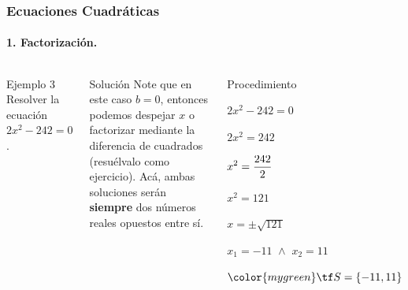 \documentclass[mathserif]{beamer}
\begin{document}
\begin{frame}
\frametitle{\bf Ecuaciones Cuadráticas} 
\framesubtitle{1. Factorización.}

    \begin{columns}
        \begin{exampleblock}{Ejemplo 3}
        \bc
        Resolver la ecuación $2x^2-242=0$.
        \ec
        \end{exampleblock}
\pause
        \begin{block}{Solución}
        Note que en este caso $b=0$, entonces podemos des\-pe\-jar $x$ o facto\-ri\-zar mediante la diferencia de cuadrados (resuélvalo como ejercicio). Acá, ambas soluciones serán \alert<2>{\bf siempre} dos números reales opuestos entre sí. 
        \end{block}
\pause
        \begin{block}{Procedimiento}
            \benu
            \item[] <4-| alert@4>$2x^2-242=0$
            \item[] <5-| alert@5>$2x^2=242$
            \item[] <6-| alert@6>$\displaystyle x^2=\frac{242}{2}$
            \item[] <7-| alert@7>$x^2=121$
            \item[] <8-| alert@8>$x=\pm\sqrt{121}$
            \item[] <9-| alert@9>$x_1=-11\,\,\wedge\,\,x_2=11$
            \item[] <10->{\bm $\color{mygreen}\tf S=\{-11,11\}$}
            \eenu
        \end{block}
    \end{columns}
\end{frame}
\end{document}
